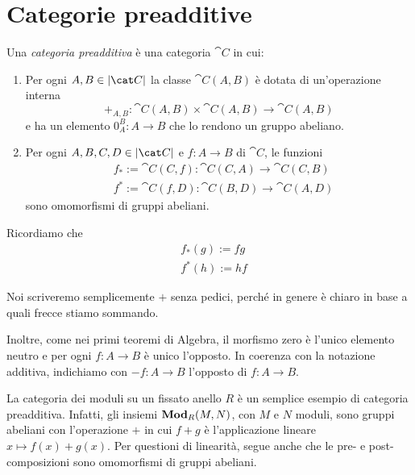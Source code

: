 \section{Categorie preadditive}

\begin{definition}
  Una {\em categoria preadditiva} è una categoria \(\cat C\) in cui:
  \begin{enumerate}[leftmargin=*]
  \item Per ogni \(A, B \in \obj{\cat C}\) la classe \(\cat C(A, B)\) è
    dotata di un'operazione interna
    \[
      +_{A,B} : \cat C (A, B) \times \cat C (A, B) \to \cat C (A, B)
    \]
    e ha un elemento \(0_A^B : A \to B\) che lo rendono un gruppo
    abeliano.
  \item Per ogni \(A, B, C, D \in \obj{\cat C}\) e \(f : A \to B\) di
    \(\cat C\), le funzioni
    \begin{align*}
      & f_\ast := \cat C(C, f) : \cat C(C, A) \to \cat C(C, B) \\
      & f^\ast := \cat C(f, D) : \cat C(B, D) \to \cat C(A, D)
    \end{align*}
    sono omomorfismi di gruppi abeliani.
  \end{enumerate}
\end{definition}

\begin{recall}
  Ricordiamo che
  \begin{align*}
    & f_\ast(g) := f g \\
    & f^\ast(h) := h f
  \end{align*}
\end{recall}

Noi scriveremo semplicemente \(+\) senza pedici, perché in genere è
chiaro in base a quali frecce stiamo sommando.

Inoltre, come nei primi teoremi di Algebra, il morfismo zero è l'unico
elemento neutro e per ogni \(f : A \to B\) è unico l'opposto. In
coerenza con la notazione additiva, indichiamo con \(- f : A \to B\)
l'opposto di \(f : A \to B\).

\begin{example}
  La categoria dei moduli su un fissato anello \(R\) è un semplice
  esempio di categoria preadditiva. Infatti, gli insiemi
  \(\mathbf{Mod}_R (M, N)\), con \(M\) e \(N\) moduli, sono gruppi abeliani con
  l'operazione \(+\) in cui \(f + g\) è l'applicazione lineare
  \(x \mapsto f(x) + g(x)\). Per questioni di linearità, segue anche che le
  pre- e post-composizioni sono omomorfismi di gruppi abeliani.
\end{example}

